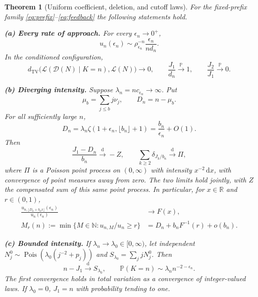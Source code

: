 \documentclass[11pt,a4paper]{article}
\numberwithin{equation}{section}
\newtheorem{theorem}{Theorem}[section]
\theoremstyle{definition}
\theoremstyle{remark}
\newcommand{\R}{\mathbb R}
\newcommand{\N}{\mathbb N}
\newcommand{\Prob}{\mathbb P}
\newcommand{\ee}{\epsilon}
\newcommand{\dd}{\,\mathrm d}
\newcommand{\dto}{\xrightarrow{\mathrm d}}
\newcommand{\pto}{\xrightarrow{\Prob}}
\newcommand{\law}{\mathcal L}
\newcommand{\tv}{d_{\mathrm{TV}}}
\DeclareMathOperator{\Pois}{Pois}
\begin{document}
\begin{theorem}[Uniform coefficient, deletion, and cutoff laws]\label{thm:main}
For the fixed-prefix family \eqref{eq:prefix}--\eqref{eq:feedback} the
following statements hold.

\smallskip\noindent\textbf{(a) Every rate of approach.}
For every $\ee_n\to0^+$,
\begin{equation}\label{eq:maincoefficient}
 \boxed{\displaystyle
 u_n(\ee_n)\sim\rho_{\ee_n}^{-n}\frac{\ee_n}{n d_n}.}
\end{equation}
In the conditioned configuration,
\begin{equation}\label{eq:mainTV}
 \tv\bigl(\law(\mathcal D(N)\mid K=n),\law(N)\bigr)\longrightarrow0,
 \qquad \frac{J_1}{d_n}\pto1,\qquad \frac{J_2}{J_1}\pto0.
\end{equation}

\smallskip\noindent\textbf{(b) Diverging intensity.}
Suppose $\lambda_n=nc_{\ee_n}\to\infty$. Put
\begin{equation}\label{eq:D}
 \mu_b=\sum_{j\le b}j\nu_j,\qquad D_n=n-\mu_b.
\end{equation}
For all sufficiently large $n$,
\begin{equation}\label{eq:Dtail}
 D_n=\lambda_n\zeta(1+\ee_n,\lfloor b_n\rfloor+1)
     =\frac{b_n}{\ee_n}+O(1).
\end{equation}
Then
\begin{equation}\label{eq:mainfluct}
 \frac{J_1-D_n}{b_n}\dto-Z,
 \qquad
 \sum_{k\ge2}\delta_{J_k/b_n}\dto\Pi,
\end{equation}
where $\Pi$ is a Poisson point process on $(0,\infty)$ with intensity
$x^{-2}\dd x$, with convergence of point measures away from zero.
The two limits hold jointly, with $Z$ the compensated sum of this same
point process. In particular, for $x\in\R$ and $r\in(0,1)$,
\begin{align}
 \frac{u_{n,\lfloor D_n+b_nx\rfloor}(\ee_n)}{u_n(\ee_n)}
 &\longrightarrow F(x),\label{eq:maincutoff}\\
 M_r(n):=\min\{M\in\N:u_{n,M}/u_n\ge r\}
 &=D_n+b_nF^{-1}(r)+o(b_n).\label{eq:mainbudget}
\end{align}

\smallskip\noindent\textbf{(c) Bounded intensity.}
If $\lambda_n\to\lambda_0\in[0,\infty)$, let independent
$N_j^0\sim\Pois(\lambda_0(j^{-2}+p_j))$ and
$S_{\lambda_0}=\sum_jjN_j^0$. Then
\begin{equation}\label{eq:mainsparse}
 n-J_1\dto S_{\lambda_0},\qquad
 \Prob(K=n)\sim\lambda_n n^{-2-\ee_n}.
\end{equation}
The first convergence holds in total variation as a convergence of
integer-valued laws. If $\lambda_0=0$, $J_1=n$ with probability tending to
one.
\end{theorem}
\end{document}
